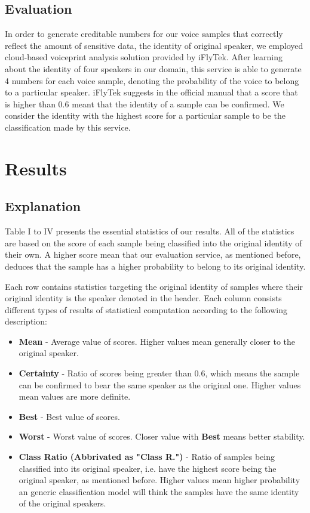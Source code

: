 \documentclass[journal]{IEEEtran} %
\begin{document}
\begin{CJK*}{UTF8}{gbsn}
\subsection{Evaluation}

In order to generate creditable numbers for our voice samples that correctly reflect the amount of sensitive data, the identity of original speaker, we employed cloud-based voiceprint analysis solution provided by iFlyTek. After learning about the identity of four speakers in our domain, this service is able to generate 4 numbers for each voice sample, denoting the probability of the voice to belong to a particular speaker. iFlyTek suggests in the official manual that a score that is higher than 0.6 meant that the identity of a sample can be confirmed. We consider the identity with the highest score for a particular sample to be the classification made by this service.

\section{Results}

\subsection{Explanation}

Table I to IV presents the essential statistics of our results. All of the statistics are based on the score of each sample being classified into the original identity of their own. A higher score mean that our evaluation service, as mentioned before, deduces that the sample has a higher probability to belong to its original identity.

Each row contains statistics targeting the original identity of samples where their original identity is the speaker denoted in the header. Each column consists different types of results of statistical computation according to the following description:

\begin{itemize}
    \item \textbf{Mean} - Average value of scores. Higher values mean generally closer to the original speaker.
    \item \textbf{Certainty} - Ratio of scores being greater than 0.6, which means the sample can be confirmed to bear the same speaker as the original one. Higher values mean values are more definite.
    \item \textbf{Best} - Best value of scores.
    \item \textbf{Worst} - Worst value of scores. Closer value with \textbf{Best} means better stability.
    \item \textbf{Class Ratio (Abbrivated as "Class R.")} - Ratio of samples being classified into its original speaker, i.e. have the highest score being the original speaker, as mentioned before. Higher values mean higher probability an generic classification model will think the samples have the same identity of the original speakers.
\end{itemize}


\end{CJK*}
\end{document}
